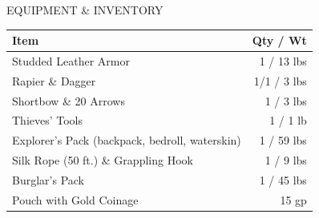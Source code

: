 \documentclass[10pt]{article}
\begin{document}
\begin{minipage}[t]{6.8cm}
  \begin{dndpanel}{EQUIPMENT \& INVENTORY}
    \scriptsize
    \renewcommand{\arraystretch}{1.12}
    \begin{tabularx}{\linewidth}{@{} >{\raggedright\arraybackslash}X r @{}}
      \textbf{Item} & \textbf{Qty / Wt} \\
      \hline
      Studded Leather Armor & 1 / 13 lbs \\
      Rapier \& Dagger & 1/1 / 3 lbs \\
      Shortbow \& 20 Arrows & 1 / 3 lbs \\
      Thieves' Tools & 1 / 1 lb \\
      Explorer's Pack (backpack, bedroll, waterskin) & 1 / 59 lbs \\
      Silk Rope (50 ft.) \& Grappling Hook & 1 / 9 lbs \\
      Burglar's Pack & 1 / 45 lbs \\
      Pouch with Gold Coinage & 15 gp \\
    \end{tabularx}
  \end{dndpanel}
\end{minipage}%
\hfill
\end{document}
